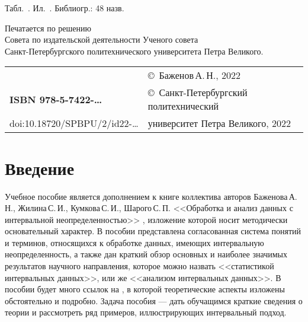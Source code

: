 \documentclass[a5paper,openany]{book}
\begin{document}
{{	
	\hfill \break
	Табл.~. Ил.~. Библиогр.: 48 назв.
	\hfill \break
	\hfill \break
	
	\begin{center}
		{\small  	
			Печатается по решению\\
			Совета по издательской деятельности Ученого совета\\
			Санкт-Петербургского политехнического  университета Петра Великого. }
	\end{center}
	
	\hfill \break
	\begin{tabular}{ll}
		~ & \copyright  \ Баженов\,А.\,Н., 2022 \\
		{\bf ISBN 978-5-7422-\ldots} & \copyright \
		Санкт-Петербургский политехнический \\
		doi:10.18720/SPBPU/2/id22-\ldots & университет Петра Великого, 2022
	\end{tabular}
	
	
	\thispagestyle{empty}

\newpage

\newpage


\newpage


\newpage

	\chapter*{Введение}



Учебное пособие является дополнением к книге коллектива авторов Баженова\,А.\,Н., Жилина\,С.\,И., Кумкова\,С.\,И., Шарого\,С.\,П.
<<Обработка и анализ данных с интервальной неопределенностью>> \cite{MetodikaBook}, изложение которой носит методически основательный характер.
В пособии представлена согласованная система понятий и терминов, относящихся к обработке данных, имеющих интервальную  неопределенность, а также
дан краткий обзор основных и наиболее значимых результатов научного направления, которое можно назвать <<статистикой интервальных данных>>, или же <<анализом интервальных 
данных>>. В пособии будет много ссылок на  \cite{MetodikaBook}, в которой теоретические аспекты изложены обстоятельно и подробно.
Задача пособия --- дать обучащимся краткие сведения о теории и рассмотреть ряд примеров, иллюстрирующих интервальный подход. %

}}
\end{document}
